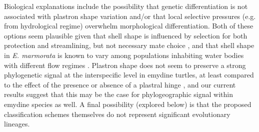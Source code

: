 \documentclass[10pt,letterpaper]{article}
\begin{document}
Biological explanations include the possibility that genetic differentiation is not associated with plastron shape variation and/or that local selective pressures (e.g. from hydrological regime) overwhelm morphological differentiation. Both of these options seem plausible given that shell shape is influenced by selection for both protection and streamlining, but not necessary mate choice \cite{Rivera2008,Rivera2011,Stayton2011,Rivera2014,Polly2016}, and that shell shape in \textit{E. marmorata} is known to vary among populations inhabiting water bodies with different flow regimes \cite{Holland1992,Lubcke2007,Germano2009}. Plastron shape does not seem to preserve a strong phylogenetic signal at the interspecific level in emydine turtles, at least compared to the effect of the presence or absence of a plastral hinge \cite{Angielczyk2011}, and our current results suggest that this may be the case for phylogeographic signal within emydine species as well. A final possibility (explored below) is that the proposed classification schemes themselves do not represent significant evolutionary lineages.
\end{document}
